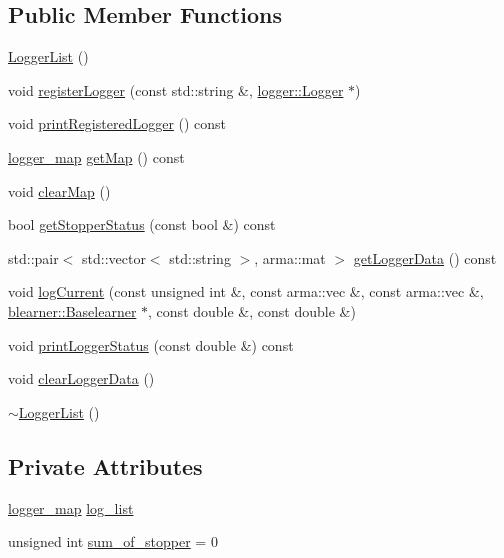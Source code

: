 \subsection*{Public Member Functions}
\begin{DoxyCompactItemize}
\item 
\hyperlink{classloggerlist_1_1_logger_list_a67a480c6b56e3e7d79736d4ccef28f63}{Logger\+List} ()
\item 
void \hyperlink{classloggerlist_1_1_logger_list_a883c2526c3e56e572df670f64b966d41}{register\+Logger} (const std\+::string \&, \hyperlink{classlogger_1_1_logger}{logger\+::\+Logger} $\ast$)
\item 
void \hyperlink{classloggerlist_1_1_logger_list_a28cd5371bbd9e31f0cf041d6e73d156c}{print\+Registered\+Logger} () const
\item 
\hyperlink{loggerlist_8h_afa233b5ec9ffbe76605d913e86d40fe6}{logger\+\_\+map} \hyperlink{classloggerlist_1_1_logger_list_a285a608bfb974314cf91e7a0137aa90f}{get\+Map} () const
\item 
void \hyperlink{classloggerlist_1_1_logger_list_affa073a05cdd9391f871f09d5f07ea11}{clear\+Map} ()
\item 
bool \hyperlink{classloggerlist_1_1_logger_list_ad11e128af600ad8e68df3c702ef11792}{get\+Stopper\+Status} (const bool \&) const
\item 
std\+::pair$<$ std\+::vector$<$ std\+::string $>$, arma\+::mat $>$ \hyperlink{classloggerlist_1_1_logger_list_a3e70bffb8e2e69c67491408337b9274f}{get\+Logger\+Data} () const
\item 
void \hyperlink{classloggerlist_1_1_logger_list_a5fc042fd489ebd88c09c469763ee9faa}{log\+Current} (const unsigned int \&, const arma\+::vec \&, const arma\+::vec \&, \hyperlink{classblearner_1_1_baselearner}{blearner\+::\+Baselearner} $\ast$, const double \&, const double \&)
\item 
void \hyperlink{classloggerlist_1_1_logger_list_a107f266cd0e6fe3c4caf743b7ecc3db5}{print\+Logger\+Status} (const double \&) const
\item 
void \hyperlink{classloggerlist_1_1_logger_list_ae06158472ad7637b8b5722f67a7c6416}{clear\+Logger\+Data} ()
\item 
\hyperlink{classloggerlist_1_1_logger_list_ad63990acf805bf149c3b006790f446c6}{$\sim$\+Logger\+List} ()
\end{DoxyCompactItemize}
\subsection*{Private Attributes}
\begin{DoxyCompactItemize}
\item 
\hyperlink{loggerlist_8h_afa233b5ec9ffbe76605d913e86d40fe6}{logger\+\_\+map} \hyperlink{classloggerlist_1_1_logger_list_a56997d07c587921a70b0b2c6538ce1f0}{log\+\_\+list}
\item 
unsigned int \hyperlink{classloggerlist_1_1_logger_list_a39c3b4cf8f01c0e29606a9b2537da347}{sum\+\_\+of\+\_\+stopper} = 0
\end{DoxyCompactItemize}


